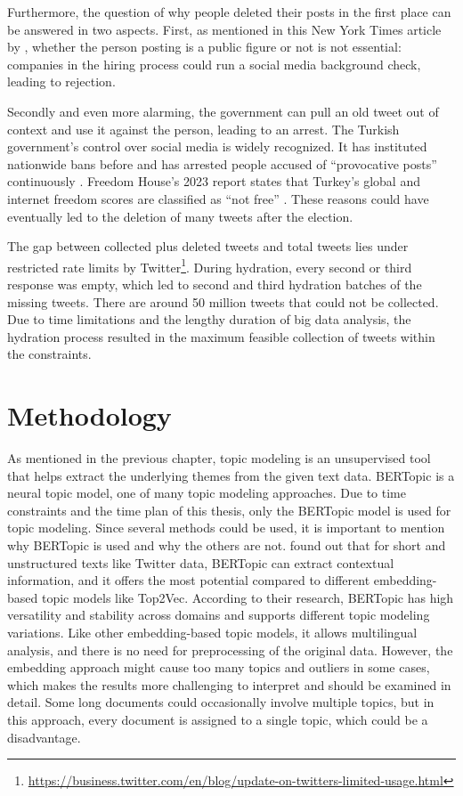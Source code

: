 Furthermore, the question of why people deleted their posts in the first place 
can be answered in two aspects. First, as mentioned in this New York Times article 
by \textcite{klosowski_delete_tweets_2022}, whether the person posting is a public figure 
or not is not essential\@: companies in the hiring process could run a social media 
background check, leading to rejection. 

Secondly and even more alarming, the government can pull 
an old tweet out of context and use it against the person, leading to an arrest. 
The Turkish government's control over social media is widely recognized. 
It has instituted nationwide bans before and has arrested people accused of 
``provocative posts'' continuously \parencite{scott_turkey_social_media_ban_2023}.
Freedom House's 2023 report states that Turkey's global and internet freedom scores are 
classified as ``not free'' \parencite{freedom-house_turkey_report}. 
These reasons could have eventually led to the deletion of many tweets 
after the election.

The gap between collected plus deleted tweets and total tweets lies under restricted 
rate limits by Twitter\footnote{\url{https://business.twitter.com/en/blog/update-on-twitters-limited-usage.html}}. 
During hydration, every second or third response was empty, which led to second 
and third hydration batches of the missing tweets. There are around 50 million tweets
that could not be collected. Due to time limitations 
and the lengthy duration of big data analysis, the hydration process resulted in the 
maximum feasible collection of tweets within the constraints.

\section{Methodology}

As mentioned in the previous chapter, topic modeling is an unsupervised tool that helps 
extract the underlying themes from the given text data. BERTopic is a neural topic model, 
one of many topic modeling approaches.
Due to time constraints and the time plan of this thesis, only the BERTopic model 
is used for topic modeling. Since several methods could be used, it is important 
to mention why BERTopic is used and why the others are not.
\textcite{topic_model_comparison_bertopic_2022} found out that for short and 
unstructured texts like Twitter data, BERTopic can extract contextual information, 
and it offers the most potential compared to different embedding-based topic models like Top2Vec.
According to their research, BERTopic has high versatility and stability across 
domains and supports different topic modeling variations. Like other embedding-based 
topic models, it allows multilingual analysis, and there is no need for 
preprocessing of the original data. However, the embedding approach might cause 
too many topics and outliers in some cases, which makes the results more 
challenging to interpret and should be examined in detail. 
Some long documents could occasionally involve multiple topics, but in this 
approach, every document is assigned to a single topic, which could be a 
disadvantage.

